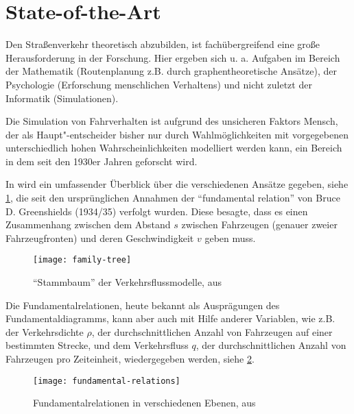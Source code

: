 \section{State-of-the-Art}
\label{sec:sota}

Den Straßenverkehr theoretisch abzubilden, ist fachübergreifend eine große Herausforderung in der Forschung.
Hier ergeben sich u. a. Aufgaben im Bereich der Mathematik (Routenplanung z.B. durch graphentheoretische Ansätze), der Psychologie (Erforschung menschlichen Verhaltens) und nicht zuletzt der Informatik (Simulationen).

Die Simulation von Fahrverhalten ist aufgrund des unsicheren Faktors Mensch, der als Haupt"-entscheider bisher nur durch Wahlmöglichkeiten mit vorgegebenen unterschiedlich hohen Wahrscheinlichkeiten modelliert werden kann, ein Bereich in dem seit den 1930er Jahren geforscht wird.

In \cite{genealogy} wird ein umfassender Überblick über die verschiedenen Ansätze gegeben, siehe \cref{figure:family-tree}, die seit den ursprünglichen Annahmen der \enquote{fundamental relation} von Bruce D. Greenshields (1934/35) verfolgt wurden. 
Diese besagte, dass es einen Zusammenhang zwischen dem Abstand $s$ zwischen Fahrzeugen (genauer zweier Fahrzeugfronten) und deren Geschwindigkeit $v$ geben muss.

\begin{figure}[hptb]
 \centering
 \texttt{[image: family-tree]}
 \caption[Überblick über die Entwicklung der Verkehrsflussmodelle]
 		{\enquote{Stammbaum} der Verkehrsflussmodelle, aus \cite{genealogy}}
 \label{figure:family-tree}
\end{figure}

Die Fundamentalrelationen, heute bekannt als Ausprägungen des Fundamentaldiagramms, kann aber auch mit Hilfe anderer Variablen, wie z.B. der Verkehrsdichte $\rho$, der durchschnittlichen Anzahl von Fahrzeugen auf einer bestimmten Strecke, und dem Verkehrsfluss $q$, der durchschnittlichen Anzahl von Fahrzeugen pro Zeiteinheit, wiedergegeben werden, siehe \cref{figure:fundamental-relations}. 

\begin{figure}[hptb]
 \centering
 \texttt{[image: fundamental-relations]}
 \caption[Fundamentalrelationen in verschiedenen Ebenen]
 		{Fundamentalrelationen in verschiedenen Ebenen, aus \cite{genealogy}}
 \label{figure:fundamental-relations}
\end{figure}

